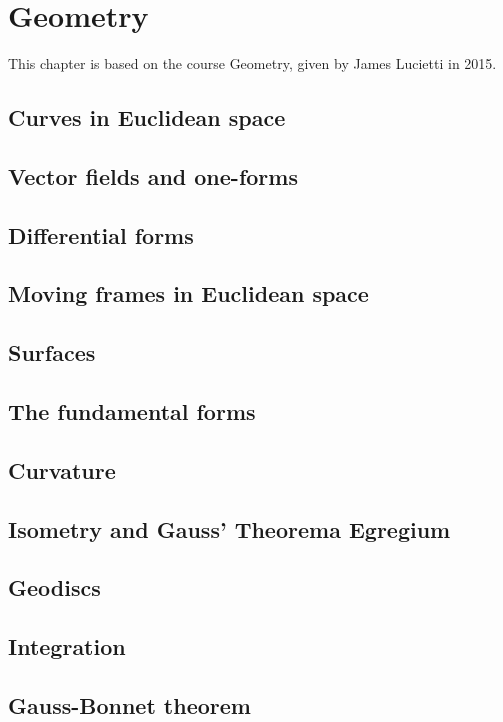 \chapter{Geometry}\label{cha:geometry}
This chapter is based on the course Geometry, given by James Lucietti in 2015.

\section{Curves in Euclidean space}

\section{Vector fields and one-forms}

\section{Differential forms}

\section{Moving frames in Euclidean space}

\section{Surfaces}

\section{The fundamental forms}

\section{Curvature}

\section{Isometry and Gauss' Theorema Egregium}

\section{Geodiscs}

\section{Integration}

\section{Gauss-Bonnet theorem}

